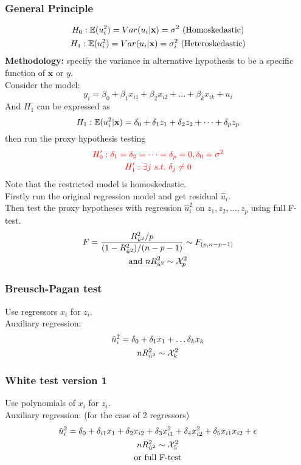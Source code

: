 \documentclass[]{article}
\begin{document}
		\subsubsection{General Principle}
			\begin{gather*}
				H_0: \mathbb{E}({u_i^2}) = Var(u_i|\textbf{x}) = \sigma^2 \text{{ (Homoskedastic)}} \\
				H_1: \mathbb{E}({u_i^2}) = Var(u_i|\textbf{x}) = \sigma_i^2 \text{{ (Heteroskedastic)}}
			\end{gather*}
			\textbf{Methodology:} specify the variance in alternative hypothesis to be a specific function of $\textbf{x}$ or $y$. \\
			Consider the model: 
			\[
				y_i = \beta_0 + \beta_1 x_{i1} + \beta_2 x_{i2} + \dots + \beta_k x_{ik} + u_i
			\]
			And $H_1$ can be expressed as 
			\[
				H_1: \mathbb{E}({u_i^2|\textbf{x}}) = \delta_0 + \delta_1 z_1 + \delta_2 z_2 + \dots + \delta_p z_p
			\]
			then run the proxy hypothesis testing
			\begin{gather*}
				\textcolor{red}{H_0': \delta_1 = \delta_2 = \dots = \delta_p = 0, \delta_0 = \sigma^2} \\
				\textcolor{red}{H_1': \exists j\ s.t.\ \delta_j \neq 0}
			\end{gather*}
			Note that the restricted model is homoskedastic. \\
			Firstly run the original regression model and get residual $\hat{u}_i$. \\
			Then test the proxy hypotheses with regression $\hat{u}_i^2$ on $z_1, z_2, \dots, z_p$ using full F-test.
			\begin{gather*}
				F = \frac{R^2_{\hat{u}^2}/p}{(1-R^2_{\hat{u}^2})/(n-p-1)} \sim F_{(p, n-p-1)} \\
				 \text{{and }}n R^2_{\hat{u}^2} \sim \mathcal{{X}}_p^2
			\end{gather*}
			
			\subsubsection{Breusch-Pagan test}
				\par Use regressors $x_i$ for $z_i$. \\
				Auxiliary regression:
				\begin{gather*}
					\hat{u}_i^2 = \delta_0 + \delta_1 x_1 + \dots \delta_k x_k \\
					n R^2_{\hat{u}^2} \sim \mathcal{{X}}_k^2
				\end{gather*}
			\subsubsection{White test version 1}
				\par Use polynomials of $x_i$ for $z_i$.\\
				Auxiliary regression: (for the case of 2 regressors)
				\begin{gather*}
					\hat{u}_i^2 = \delta_0 + \delta_{i1} x_1 + \delta_2 x_{i2} + \delta_3 x_{i1}^2 + \delta_4 x_{i2}^2 + \delta_5 x_{i1} x_{i2} + \epsilon \\
					n R^2_{\hat{u}^2} \sim \mathcal{{X}}_5^2 \\
					\text{{or full F-test}}
				\end{gather*}
\end{document}
